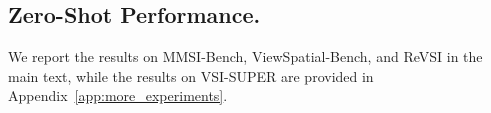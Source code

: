 \documentclass{llmxive}
\providecommand{\cone}[1]{\cellcolor{top1color}\textbf{#1}}
\providecommand{\ctwo}[1]{\cellcolor{top2color}#1}
\providecommand{\cthree}[1]{\cellcolor{top3color}#1}
\providecommand{\dpos}[1]{{\tiny\,(+#1)}}
\begin{document}


\vspace{-2mm}
\subsection{Zero-Shot Performance.}
\label{sec:experiments:zeroshot}
We report the results on MMSI-Bench, ViewSpatial-Bench, and ReVSI in the main text, while the results on VSI-SUPER are provided in Appendix~\ref{app:more_experiments}.
\end{document}
